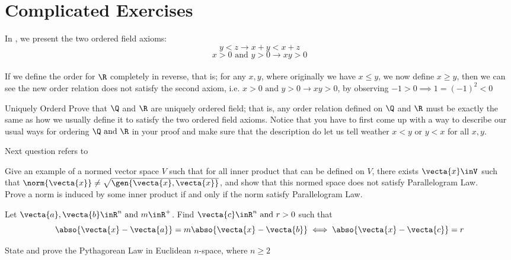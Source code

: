 \documentclass{report}
\begin{document}
\section{Complicated Exercises}
In , we present the two ordered field axioms:
\begin{equation*}
y<z\longrightarrow x+y<x+z
\end{equation*}
\begin{equation*}
x>0\text{ and }y>0\longrightarrow xy>0
\end{equation*}\\
If we define the order for $\R$ completely in reverse, that is; for any $x,y$, where originally we  have  $x\leq y$, we now define $x\geq y$, then we can see the new order relation does not satisfy the second axiom, i.e. $x>0\text{ and }y>0\rightarrow xy>0$, by observing $-1>0\implies 1=(-1)^2<0$
\begin{question}{
  Uniquely Orderd}{}
Prove that $\Q$ and $\R$ are uniquely ordered field; that is, any order relation defined on $\Q$ and  $\R$ must be exactly the same as how we usually define it to satisfy the two ordered field axioms. Notice that you have to first come up with a way to describe our usual ways for ordering $\Q\text{ and }\R$ in your proof and make sure that the description do let us tell weather $x< y$ or $y< x$ for all $x,y$.       
\end{question}
Next question refers to 
\begin{question}{}{}
  Give an example of a normed vector space $V$ such that for all inner product that can be defined on $V$, there exists  $\vecta{x}\inV$ such that $\norm{\vecta{x}}\neq \sqrt{\gen{\vecta{x},\vecta{x}}}$, and show that this normed space does not satisfy Parallelogram Law.\\

Prove a norm is induced by some inner product if and only if the norm satisfy Parallelogram Law.
\end{question}
\begin{question}{}{}
Let $\vecta{a},\vecta{b}\inR^n\text{ and }m \inR^+$. Find $\vecta{c}\inR^n\text{ and }r>0$ such that
\begin{equation*}
\abso{\vecta{x}-\vecta{a}}=m\abso{\vecta{x}-\vecta{b}}\iff \abso{\vecta{x}-\vecta{c}}=r
\end{equation*}
\end{question} 
\begin{question}{}{}
State and prove the Pythagorean Law in Euclidean $n$-space, where  $n\geq 2$
\end{question}
\end{document}
